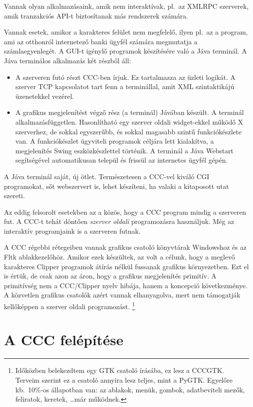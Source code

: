 Vannak olyan alkalmazásaink, amik nem interaktívak,
pl.\  az XMLRPC szerverek, amik  tranzakciós 
API-t biztosítanak más rendszerek számára.

Vannak esetek, amikor a karakteres felület nem megfelelő, 
ilyen pl.\ az a program, ami az otthonról internetező banki ügyfél 
számára megmutatja a számlaegyenlegét. A GUI-t igénylő programok
készítésére való a Jáva terminál. A Jáva terminálos alkalmazás két
részből áll:
\begin{itemize}
\item
    A szerveren futó részt CCC-ben írjuk. 
    Ez tartalmazza az  üzleti logikát. A szerver TCP kapcsolatot 
    tart fenn a terminállal,  amit XML szintaktikájú üzenetekkel vezérel.
\item
    A grafikus megjelenítést végző rész (a terminál) Jávában készült. 
    A terminál alkalmazásfüggetlen. Hasonlítható egy szerver oldali 
    widget-ekkel működő X szerverhez, de sokkal  egyszerűbb, 
    és sokkal magasabb szintű funkciókészlete van.
    A funkciókészlet ügyviteli programok céljára lett kialakítva,
    a megjelenítés Swing eszközkészlettel történik.
    A terminál a Jáva Webstart segítségével automatikusan
    települ és frissül az internetes ügyfél gépén.
\end{itemize}
A Jáva terminál saját, új ötlet.
Természetesen a CCC-vel kiváló CGI programokat, sőt webszervert is, 
lehet készíteni, ha valaki a kitaposott utat szereti.

Az eddig felsorolt esetekben az a közös, hogy a CCC program
mindig a szerveren fut. A CCC-t tehát döntően {\em szerver oldali\/} 
programozásra  használjuk. Még az interaktív programjaink is 
a szerveren futnak.

A CCC régebbi rétegeiben vannak grafikus csatoló könyvtárak
Windowshoz és az Fltk ablakkezelőhöz. Amikor ezek készültek,
az volt a célunk, hogy a meglevő karakteres Clipper  programok
átírás nélkül fussanak grafikus környezetben. Ezt el is értük,
de csak azon az áron, hogy  a grafikus megjelenítés primitív.
A primitívség nem a CCC/Clipper nyelv hibája, hanem a koncepció 
következménye. 
A közvetlen grafikus csatolók azért vannak elhanyagolva,
mert nem támogatják kellőképpen a szerver oldali programozást.%
\footnote{
Időközben belekezdtem egy GTK csatoló írásába, ez lesz a CCCGTK. 
Terveim szerint ez a csatoló annyira lesz teljes, mint a PyGTK. 
Egyelőre  kb.~10\%-os állapotban van: az ablakok, menük, gombok, 
adatbeviteli mezők, feliratok, keretek, \ldots már működnek.}
 

\section{A CCC felépítése}


